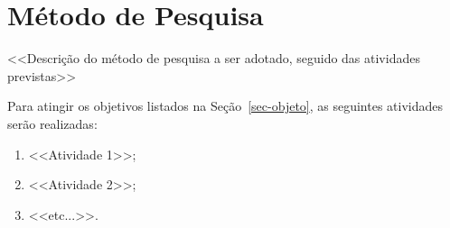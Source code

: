 \section{Método de Pesquisa}
\label{sec-metodo}

<<Descrição do método de pesquisa a ser adotado, seguido das atividades previstas>>

Para atingir os objetivos listados na Seção~\ref{sec-objeto}, as seguintes atividades serão realizadas:

\begin{enumerate}
	\item <<Atividade 1>>;
	\item <<Atividade 2>>;
	\item <<etc...>>.
\end{enumerate}

